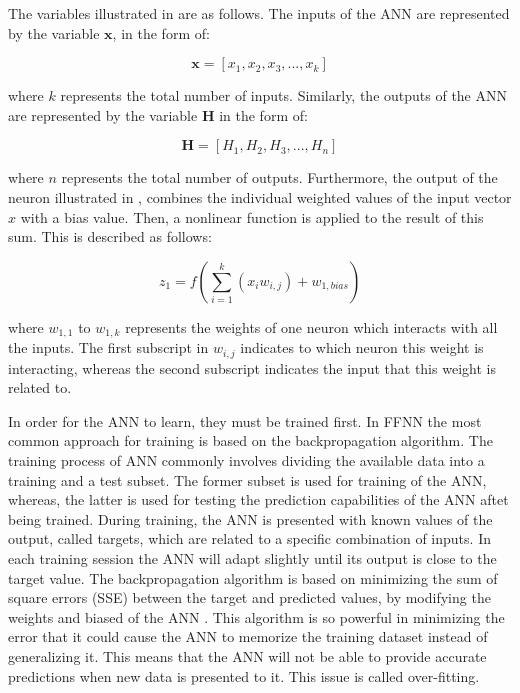 The variables illustrated in  are as follows. The inputs of the ANN are represented by the variable $\mathbf{x}$, in the form of:

\begin{equation}
    \mathbf{x} = [x_1, x_2, x_3, ... , x_k ]
    \label{c6_neuronin}
\end{equation}

\noindent where $k$ represents the total number of inputs. Similarly, the outputs of the ANN are represented by the variable $\mathbf{H}$ in the form of:

\begin{equation}
    \mathbf{H} = [H_1, H_2, H_3, ... , H_n ]
    \label{c6_networkout}
\end{equation}

\noindent where $n$ represents the total number of outputs. Furthermore, the output of the neuron illustrated in , combines the individual weighted values of the input vector $x$ with a bias value. Then, a nonlinear function is applied to the result of this sum. This is described as follows:

\begin{equation}
    z_1 = f \left( \sum_{i=1}^k(x_i w_{i,j}) + w_{1,bias} \right)
\label{c6_neuronout}
\end{equation}

\noindent where $w_{1,1}$ to $w_{1,k}$ represents the weights of one neuron which interacts with all the inputs. The first subscript in $w_{i,j}$ indicates to which neuron this weight is interacting, whereas the second subscript indicates the input that this weight is related to.

In order for the ANN to learn, they must be trained first. In FFNN the most common approach for training is based on the backpropagation algorithm. The training process of ANN commonly involves dividing the available data into a training and a test subset. The former subset is used for training of the ANN, whereas, the latter is used for testing the prediction capabilities of the ANN aftet being trained. During training, the ANN is presented with known values of the output, called targets, which are related to a specific combination of inputs. In each training session the ANN will adapt slightly until its output is close to the target value. The backpropagation algorithm is based on minimizing the sum of square errors (SSE) between the target and predicted values, by modifying the weights and biased of the ANN \cite{zhang2003artificial}. This algorithm is so powerful in minimizing the error that it could cause the ANN to memorize the training dataset instead of generalizing it. This means that the ANN will not be able to provide accurate predictions when new data is presented to it. This issue is called over-fitting.

